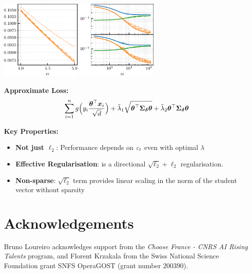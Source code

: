 \documentclass[a0paper,fleqn]{betterportraitposter}
\theoremstyle{plain}
\theoremstyle{definition}
\theoremstyle{remark}
\begin{document}
{\begin{multicols}{3}
\begin{center}
\includegraphics[width=0.3\textwidth]{Assets/gen_lambda_optimal_sweep_alpha.pdf}
\includegraphics[width=0.3\textwidth]{Assets/effective_regularisation.pdf}
\end{center}

\textbf{Approximate Loss:}
\begin{equation}
    \sum_{i = 1}^{n} 
    g \Big( y_{i} \frac{\boldsymbol{\theta}^\top \boldsymbol{x}_{i}}{\sqrt{d}} \Big) 
    + \tilde{\lambda}_1 \sqrt{\boldsymbol{\theta}^\top \boldsymbol{\Sigma}_{\boldsymbol{\delta}} \boldsymbol{\theta}} + \tilde{\lambda}_2 \boldsymbol{\theta}^\top \boldsymbol{\Sigma}_{\boldsymbol{\delta}} \boldsymbol{\theta}
\end{equation}

\textbf{Key Properties:}
\begin{itemize}
    \item \textbf{Not just $\ell_2$}: Performance depends on $\varepsilon_t$ even with optimal $\lambda$
    \item \textbf{Effective Regularisation}: is a directional \(\sqrt{\ell_2} + \ell_2\) regularisation. 
    \item \textbf{Non-sparse}: $\sqrt{\ell_2}$ term provides linear scaling in the norm of the student vector without sparsity
\end{itemize}

\section{Acknowledgements}

Bruno Loureiro acknowledges support from the \textit{Choose France - CNRS AI Rising Talents} program, and Florent Krzakala from the Swiss National Science Foundation grant SNFS OperaGOST  (grant number $200390$).





\columnbreak

\end{multicols}
}
\end{document}
